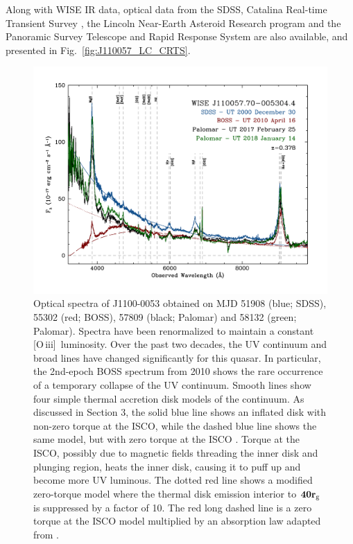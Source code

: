 \documentclass[a4paper,fleqn,usenatbib]{mnras}
\begin{document}
Along with WISE IR data, optical data from the SDSS, Catalina
Real-time Transient Survey \citep[CRTS;][]{Drake2009, Mahabal2011},
the Lincoln Near-Earth Asteroid Research \citep[LINEAR; ][]{Sesar2011}
program and the Panoramic Survey Telescope and Rapid Response System
\citep[PanSTARRS;][]{Kaiser2010, Stubbs2010, Tonry2012, Magnier2013}
are also available, and presented in Fig.~\ref{fig:J110057_LC_CRTS}.




\begin{figure}
  \centering
  \includegraphics[width=17.00cm, trim=0.0cm 0.0cm 0.0cm 0.0cm, clip]
  {w1100m0052_sdss2.pdf}
\vspace{-16pt}
  \caption[]{
    Optical spectra of J1100-0053 obtained on MJD 51908 (blue; SDSS),
    55302 (red; BOSS), 57809 (black; Palomar) and 58132 (green;
    Palomar). Spectra have been renormalized to maintain a constant
    [O\,{\sc iii}]\ luminosity. Over the past two decades, the UV
    continuum and broad lines have changed significantly for this quasar.
    In particular, the 2nd-epoch BOSS spectrum from 2010 shows the rare
    occurrence of a temporary collapse of the UV continuum.  Smooth lines
    show four simple thermal accretion disk models of the continuum.
    As discussed in Section 3, the solid blue line shows an inflated
    disk with non-zero torque at the ISCO, while the dashed blue line
    shows the same model, but with zero torque at the ISCO \cite[i.e.,
    equivalent to a simple $\alpha$-disk model,][]{SS73}.  Torque at the
    ISCO, possibly due to magnetic fields threading the inner disk and
    plunging region, heats the inner disk, causing it to puff up and
    become more UV luminous.  The dotted red line shows a modified
    zero-torque model where the thermal disk emission interior to ${\bf 40
      r_{\rm g}}$ is suppressed by a factor of 10.
    The red long dashed line is a zero
    torque at the ISCO model multiplied by an absorption law adapted from
    \citet{Guo2016}.
}
  \label{fig:J110057_spectra}
\end{figure}
\end{document}
